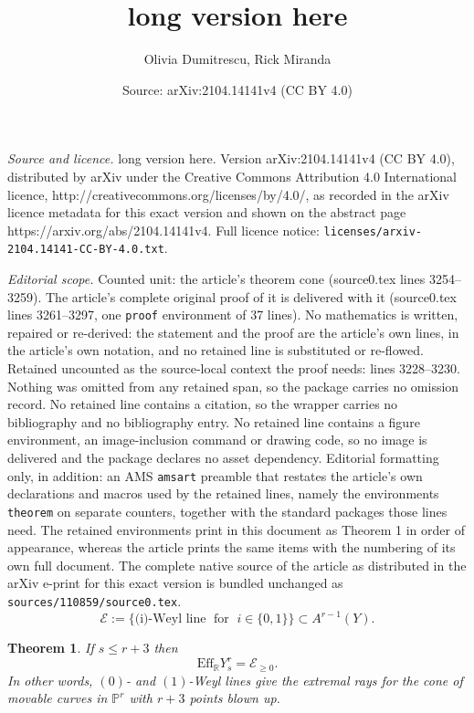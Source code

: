 \documentclass[10pt,a4paper]{amsart}
\title{long version here}
\author{Olivia Dumitrescu, Rick Miranda}
\date{Source: arXiv:2104.14141v4 (CC BY 4.0)}
\newtheorem{theorem}{Theorem}
\begin{document}
\maketitle

\noindent\emph{Source and licence.} long version here. Version arXiv:2104.14141v4 (CC BY 4.0), distributed by arXiv under the Creative Commons Attribution 4.0 International licence, http://creativecommons.org/licenses/by/4.0/, as recorded in the arXiv licence metadata for this exact version and shown on the abstract page https://arxiv.org/abs/2104.14141v4. Full licence notice: \texttt{licenses/arxiv-2104.14141-CC-BY-4.0.txt}.\par\smallskip

\noindent\textit{Editorial scope.} Counted unit: the article's theorem cone (source0.tex lines 3254--3259). The article's complete original proof of it is delivered with it (source0.tex lines 3261--3297, one \texttt{proof} environment of 37 lines). No mathematics is written, repaired or re-derived: the statement and the proof are the article's own lines, in the article's own notation, and no retained line is substituted or re-flowed.  Retained uncounted as the source-local context the proof needs: lines 3228--3230.  Nothing was omitted from any retained span, so the package carries no omission record.  No retained line contains a citation, so the wrapper carries no bibliography and no bibliography entry.  No retained line contains a figure environment, an image-inclusion command or drawing code, so no image is delivered and the package declares no asset dependency.  Editorial formatting only, in addition: an AMS \texttt{amsart} preamble that restates the article's own declarations and macros used by the retained lines, namely the environments \texttt{theorem} on separate counters, together with the standard packages those lines need.  The retained environments print in this document as Theorem 1 in order of appearance, whereas the article prints the same items with the numbering of its own full document.  The complete native source of the article as distributed in the arXiv e-print for this exact version is bundled unchanged as \texttt{sources/110859/source0.tex}.
\begin{equation}\label{equation1}
\mathcal{E}:=\{\text{(i)-Weyl line}  \;\text{ for }\; i \in \{0,1\}\} \subset A^{r-1}(Y).
\end{equation}

\begin{theorem}\label{effective cone}
 If $s \leq r+3$ then
 $$\text{Eff}_{\mathbb{R}} Y^r_s = \mathcal{E}_{\geq 0}.$$
In other words, $(0)$- and $(1)$-Weyl lines give the extremal rays
for the cone of movable curves in $\mathbb{P}^r$ with $r+3$ points blown up.
\end{theorem}
\end{document}
